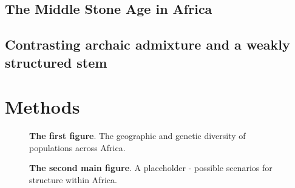 \documentclass[]{article}
\begin{document}
\subsection*{The Middle Stone Age in Africa}

\subsection*{Contrasting archaic admixture and a weakly structured stem}

\section*{Methods}
\cite{Kelleher2016-lw}

\begin{figure}[ht]
\begin{center}
\caption{\textbf{The first figure}.
    The geographic and genetic diversity of populations across Africa.
}
\label{fig:1}
\end{center}
\end{figure}

\begin{figure}[ht]
\begin{center}
\caption{\textbf{The second main figure}.
    A placeholder - possible scenarios for structure within Africa.
}
\label{fig:2}
\end{center}
\end{figure}
\end{document}
